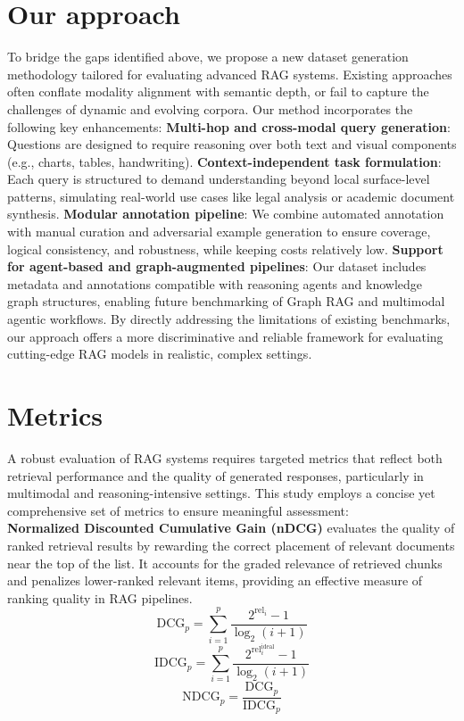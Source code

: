 \documentclass[12pt,twoside]{report}
\begin{document}
\section{Our approach}
To bridge the gaps identified above, we propose a new dataset generation methodology tailored for evaluating advanced RAG systems. Existing approaches often conflate modality alignment with semantic depth, or fail to capture the challenges of dynamic and evolving corpora. Our method incorporates the following key enhancements:
\textbf{Multi-hop and cross-modal query generation}: Questions are designed to require reasoning over both text and visual components (e.g., charts, tables, handwriting).
\textbf{Context-independent task formulation}: Each query is structured to demand understanding beyond local surface-level patterns, simulating real-world use cases like legal analysis or academic document synthesis.
\textbf{Modular annotation pipeline}: We combine automated annotation with manual curation and adversarial example generation to ensure coverage, logical consistency, and robustness, while keeping costs relatively low.
\textbf{Support for agent-based and graph-augmented pipelines}: Our dataset includes metadata and annotations compatible with reasoning agents and knowledge graph structures, enabling future benchmarking of Graph RAG and multimodal agentic workflows.
By directly addressing the limitations of existing benchmarks, our approach offers a more discriminative and reliable framework for evaluating cutting-edge RAG models in realistic, complex settings.

\section{Metrics}
A robust evaluation of RAG systems requires targeted metrics that reflect both retrieval performance and the quality of generated responses, particularly in multimodal and reasoning-intensive settings. This study employs a concise yet comprehensive set of metrics to ensure meaningful assessment: \\
\textbf{Normalized Discounted Cumulative Gain (nDCG)} evaluates the quality of ranked retrieval results by rewarding the correct placement of relevant documents near the top of the list. It accounts for the graded relevance of retrieved chunks and penalizes lower-ranked relevant items, providing an effective measure of ranking quality in RAG pipelines. \\
\[
\mathrm{DCG}_p = \sum_{i=1}^{p} \frac{2^{\text{rel}_i} - 1}{\log_2(i + 1)}
\]
\[
\mathrm{IDCG}_p = \sum_{i=1}^{p} \frac{2^{\text{rel}_i^{\text{ideal}}} - 1}{\log_2(i + 1)}
\]
\[
\mathrm{NDCG}_p = \frac{\mathrm{DCG}_p}{\mathrm{IDCG}_p}
\]
\end{document}
